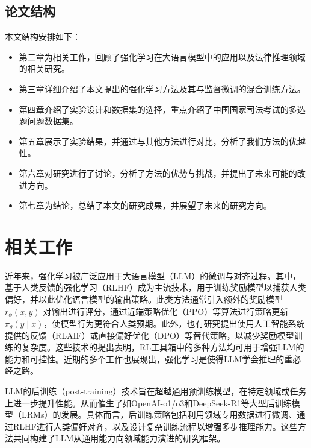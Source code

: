 \documentclass{pkuthesis}
\begin{document}
\subsection{论文结构}
本文结构安排如下：
\begin{itemize}
    \item 第二章为相关工作，回顾了强化学习在大语言模型中的应用以及法律推理领域的相关研究。
    \item 第三章详细介绍了本文提出的强化学习方法及其与监督微调的混合训练方法。
    \item 第四章介绍了实验设计和数据集的选择，重点介绍了中国国家司法考试的多选题问题数据集。
    \item 第五章展示了实验结果，并通过与其他方法进行对比，分析了我们方法的优越性。
    \item 第六章对研究进行了讨论，分析了方法的优势与挑战，并提出了未来可能的改进方向。
    \item 第七章为结论，总结了本文的研究成果，并展望了未来的研究方向。
\end{itemize}

\section{相关工作}
近年来，强化学习被广泛应用于大语言模型（LLM）的微调与对齐过程。其中，基于人类反馈的强化学习（RLHF）成为主流技术，用于训练奖励模型以捕获人类偏好，并以此优化语言模型的输出策略。此类方法通常引入额外的奖励模型 $r_{\phi}(x, y)$ 对输出进行评分，通过近端策略优化（PPO）等算法进行策略更新 $\pi_{\theta}(y \mid x)$，使模型行为更符合人类预期。此外，也有研究提出使用人工智能系统提供的反馈（RLAIF）或直接偏好优化（DPO）等替代策略，以减少奖励模型训练的复杂度。这些技术的提出表明，RL工具箱中的多种方法均可用于增强LLM的能力和可控性。近期的多个工作也展现出，强化学习是使得LLM学会推理的重必经之路。

LLM的后训练（post-training）技术旨在超越通用预训练模型，在特定领域或任务上进一步提升性能。从而催生了如OpenAI-o1/o3和DeepSeek-R1等大型后训练模型（LRMs）的发展。具体而言，后训练策略包括利用领域专用数据进行微调、通过RLHF进行人类偏好对齐，以及设计复杂训练流程以增强多步推理能力。这些方法共同构建了LLM从通用能力向领域能力演进的研究框架。
\end{document}

